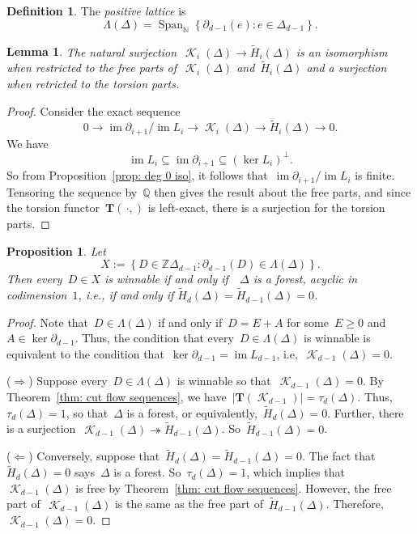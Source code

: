 \documentclass[12pt]{article}
\newcommand{\N}{\mathbb{N}}
\newcommand{\Z}{\mathbb{Z}}
\newcommand{\Q}{\mathbb{Q}}
\newcommand{\T}{\mathbf{T}}
\newcommand{\tH}{\widetilde{H}}
\DeclareMathOperator{\Span}{\mathrm{Span}}
\DeclareMathOperator{\im}{\mathrm{im}}
\DeclareMathOperator{\crit}{\mathcal{K}}
\newtheorem{lemma}[theorem]{Lemma}
\newtheorem{prop}[theorem]{Proposition}
\theoremstyle{definition}
\newtheorem{definition}[theorem]{Definition}
\theoremstyle{remark}
\begin{document}
\begin{definition}  The {\em positive lattice} is
  \[
    \Lambda(\Delta) = \Span_{\N}\left\{ \partial_{d-1}(e):e\in\Delta_{d-1} \right\}.
  \]
\end{definition}

\begin{lemma} The natural
  surjection~$\crit_i(\Delta)\to\tH_i(\Delta)$ is an isomorphism
  when restricted to the free parts of~$\crit_i(\Delta)$ and~$\tH_i(\Delta)$
  and a surjection when retricted to the torsion parts.
\end{lemma}
\begin{proof} Consider the exact sequence
  \[
    0\to\im\partial_{i+1}/\im L_i\to\crit_i(\Delta)\to\tH_i(\Delta)\to0.
  \]
  We have
  \[
    \im L_i\subseteq\im\partial_{i+1}\subseteq(\ker L_i)^{\perp}.
  \]
  So from Proposition~\ref{prop: deg 0 iso}, it follows that~$\im\partial_{i+1}/\im
  L_i$ is finite.  Tensoring the sequence by~$\Q$ then gives the result about
  the free parts, and since the torsion functor~$\T(\,\cdot,)$ is
  left-exact, there is a surjection for the torsion parts.
\end{proof}

\begin{prop}  Let
  \[
    X:=\left\{ D\in\Z\Delta_{d-1}:\partial_{d-1}(D)\in\Lambda(\Delta) \right\}.
  \] 
  Then every~$D\in X$ is winnable if and only if~~$\Delta$ is a forest, acyclic
  in codimension~$1$, i.e., if and only if $\tH_d(\Delta)=\tH_{d-1}(\Delta)=0$.
\end{prop}
\begin{proof}  Note that~$D\in\Lambda(\Delta)$ if and only if~$D=E+A$ for
  some~$E\geq0$ and~$A\in\ker\partial_{d-1}$.  Thus, the condition
  that every~$D\in\Lambda(\Delta)$ is winnable is equivalent to the condition
  that~$\ker\partial_{d-1}=\im L_{d-1}$, i.e,~$\crit_{d-1}(\Delta)=0$.

  ($\Rightarrow$) Suppose every~$D\in\Lambda(\Delta)$ is winnable so
  that~$\crit_{d-1}(\Delta)=0$.  By Theorem~\ref{thm: cut flow sequences}, we
  have~$|\T(\crit_{d-1})|=\tau_d(\Delta)$.  Thus,~$\tau_d(\Delta)=1$, so
  that~$\Delta$ is a forest, or equivalently,~$\tH_d(\Delta)=0$.  Further, there is a
  surjection~$\crit_{d-1}(\Delta)\twoheadrightarrow\tH_{d-1}(\Delta)$.
  So~$\tH_{d-1}(\Delta)=0$.

  ($\Leftarrow$) Conversely, suppose that~$\tH_{d}(\Delta)=\tH_{d-1}(\Delta)=0$.
  The fact that~$\tH_d(\Delta)=0$ says~$\Delta$ is a forest.  So~$\tau_d(\Delta)=1$, which implies
  that~$\crit_{d-1}(\Delta)$ is free by Theorem~\ref{thm: cut flow sequences}.
  However, the free part of~$\crit_{d-1}(\Delta)$ is the same as the free part
  of~$\tH_{d-1}(\Delta)$.  Therefore,~$\crit_{d-1}(\Delta)=0$.
\end{proof}
\end{document}
